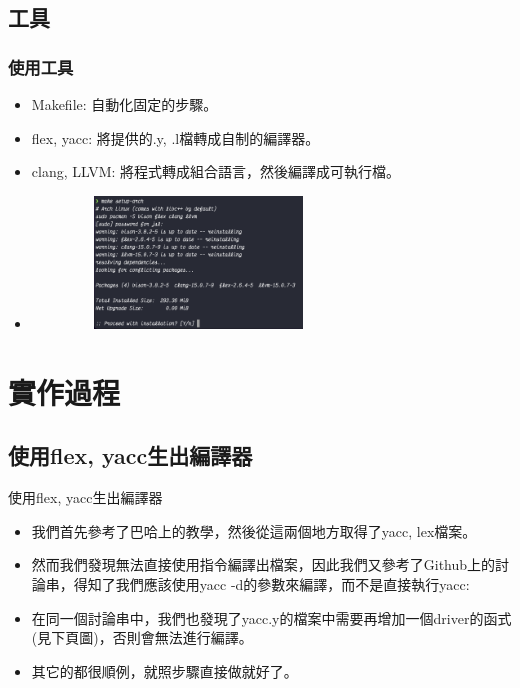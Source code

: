 \documentclass{beamer}
\begin{document}
\subsection{工具}
\begin{frame}
  \frametitle{使用工具}
  \begin{itemize}
    \item Makefile: 自動化固定的步驟。
    \item flex, yacc: 將提供的.y, .l檔轉成自制的編譯器。
    \item clang, LLVM: 將程式轉成組合語言，然後編譯成可執行檔。
    \item 
    \includegraphics[width=250pt,height=100pt]{238532181-1faf40c2-514c-408a-8031-e7a7a61af23c}
  \end{itemize}
\end{frame}

\section{實作過程}
\subsection{使用flex, yacc生出編譯器}
\begin{frame}{使用flex, yacc生出編譯器}
\begin{itemize}
    \item 我們首先參考了巴哈上的教學\cite{Lex}，然後從這兩個地方\cite{ANSILex, ANSIYacc}取得了yacc, lex檔案。
    \item 然而我們發現無法直接使用指令編譯出檔案，因此我們又參考了Github上的討論串\cite{C99Grammars}，得知了我們應該使用yacc -d的參數來編譯，而不是直接執行yacc: 
    \item 在同一個討論串中，我們也發現了yacc.y的檔案中需要再增加一個driver的函式(見下頁圖)，否則會無法進行編譯。
    \item 其它的都很順例，就照步驟直接做就好了。
\end{itemize}
\end{frame}
\end{document}
